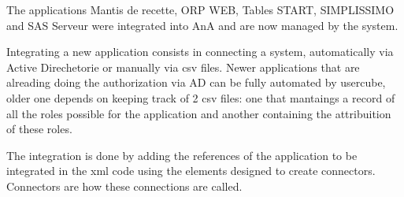 The applications Mantis de recette, ORP WEB, Tables START, SIMPLISSIMO and SAS Serveur were integrated into AnA and are now managed by the system. 

Integrating a new application consists in connecting a system, automatically via Active Direchetorie or manually via csv files. Newer applications that are alreading doing the authorization via AD can be fully automated by usercube, older one depends on keeping track of 2 csv files: one that mantaings a record of all the roles possible for the application and another containing the attribuition of these roles.

The integration is done by adding the references of the application to be integrated in the xml code using the elements designed to create connectors. Connectors are how these connections are called.